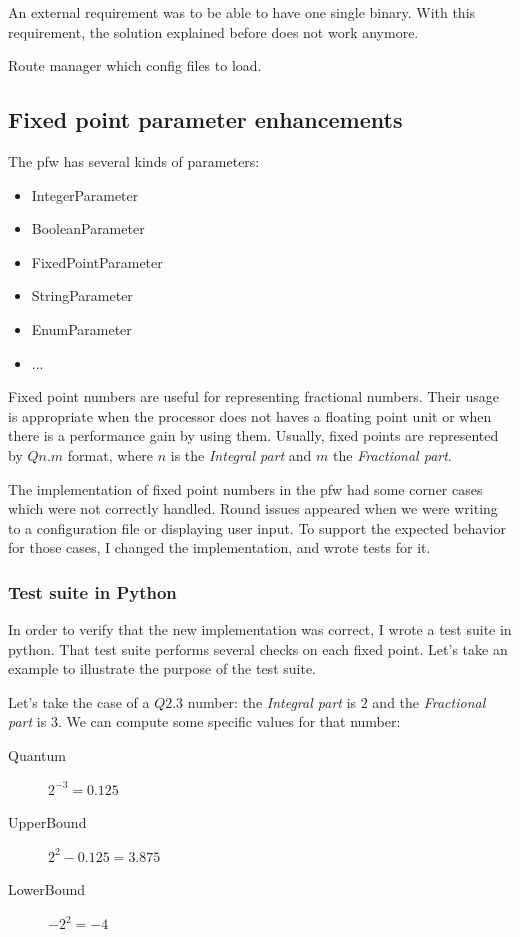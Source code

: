 An external requirement was to be able to have one single binary. With this
requirement, the solution explained before does not work anymore.

Route manager which config files to load.


\subsection{Fixed point parameter enhancements}
The \gls{pfw} has several kinds of parameters:
\begin{itemize}
    \item IntegerParameter
    \item BooleanParameter
    \item FixedPointParameter
    \item StringParameter
    \item EnumParameter
    \item ...
\end{itemize}

Fixed point numbers are useful for representing fractional numbers. Their
usage is appropriate when the processor does not haves a floating point unit
or when there is a performance gain by using them. Usually, fixed points are
represented by $Qn.m$ format, where $n$ is the \emph{Integral part} and $m$ the
\emph{Fractional part}.

The implementation of fixed point numbers in the \gls{pfw} had some
corner cases which were not correctly handled. Round issues appeared when we
were writing to a configuration file or displaying user input. To
support the expected behavior for those cases, I changed the implementation, and
wrote tests for it.

\subsubsection{Test suite in Python}

In order to verify that the new implementation was correct, I wrote a test suite
in \gls{python}. That test suite performs several checks on each fixed point. Let's
take an example to illustrate the purpose of the test suite.

Let's take the case of a $Q2.3$ number: the \emph{Integral part} is $2$ and the
\emph{Fractional part} is $3$. We can compute some specific values for that number:

\begin{description}
    \item[Quantum] $2^{-3} = 0.125$
    \item[UpperBound] $2^2 - 0.125 = 3.875$
    \item[LowerBound] $-2^2 = -4$
\end{description}

